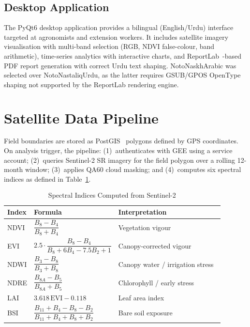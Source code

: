 \documentclass[conference]{IEEEtran}
\begin{document}
\subsection{Desktop Application}

The PyQt6 desktop application provides a bilingual (English/Urdu) interface
targeted at agronomists and extension workers. It includes satellite imagery
visualisation with multi-band selection (RGB, NDVI false-colour, band
arithmetic), time-series analytics with interactive charts, and
ReportLab~\cite{reportlab}-based PDF report generation with correct Urdu text
shaping. NotoNaskhArabic was selected over NotoNastaliqUrdu, as the latter requires
GSUB/GPOS OpenType shaping not supported by the ReportLab rendering engine.

\section{Satellite Data Pipeline}

Field boundaries are stored as PostGIS~\cite{postgis} polygons defined by GPS
coordinates. On analysis trigger, the pipeline: (1)~authenticates with GEE
using a service account; (2)~queries Sentinel-2 SR imagery for the field
polygon over a rolling 12-month window; (3)~applies QA60 cloud masking; and
(4)~computes six spectral indices as defined in Table~\ref{tab:indices}.

\begin{table}[htbp]
  \caption{Spectral Indices Computed from Sentinel-2}
  \label{tab:indices}
  \centering
  \renewcommand{\arraystretch}{1.35}
  \begin{tabular}{p{0.85cm} p{3.9cm} p{2.4cm}}
    \toprule
    \textbf{Index} & \textbf{Formula} & \textbf{Interpretation} \\
    \midrule
    NDVI &
      $\dfrac{B_8 - B_4}{B_8 + B_4}$ &
      Vegetation vigour~\cite{rouse1974} \\[6pt]
    EVI &
      $2.5\cdot\dfrac{B_8 - B_4}{B_8 + 6B_4 - 7.5B_2 + 1}$ &
      Canopy-corrected vigour~\cite{gitelson2002} \\[6pt]
    NDWI &
      $\dfrac{B_3 - B_8}{B_3 + B_8}$ &
      Canopy water / irrigation stress~\cite{karthikeyan2020} \\[6pt]
    NDRE &
      $\dfrac{B_{8A} - B_5}{B_{8A} + B_5}$ &
      Chlorophyll / early stress~\cite{gitelson2002,clevers2013} \\[6pt]
    LAI &
      $3.618\,\mathrm{EVI} - 0.118$ &
      Leaf area index~\cite{xie2019} \\[4pt]
    BSI &
      $\dfrac{B_{11}+B_4-B_8-B_2}{B_{11}+B_4+B_8+B_2}$ &
      Bare soil exposure~\cite{omia2023} \\
    \bottomrule
  \end{tabular}
\end{table}
\end{document}
